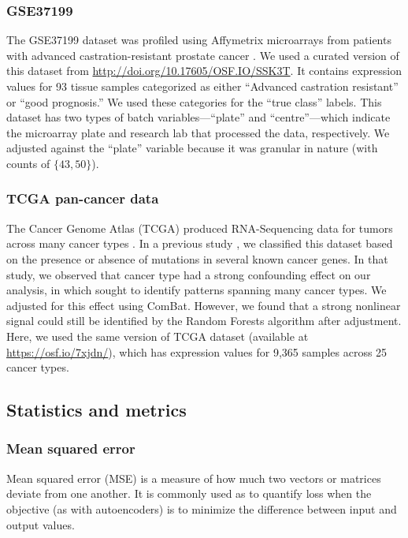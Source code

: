 \documentclass[11pt]{article}
\begin{document}
\subsubsection{GSE37199}

The GSE37199 dataset was profiled using Affymetrix microarrays from patients with advanced castration-resistant prostate cancer \cite{olmos_prognostic_2012}.
We used a curated version of this dataset from \url{http://doi.org/10.17605/OSF.IO/SSK3T}\cite{golightly_curated_2018}.
It contains expression values for 93 tissue samples categorized as either ``Advanced castration resistant'' or ``good prognosis.''
We used these categories for the ``true class'' labels.
This dataset has two types of batch variables---``plate'' and ``centre''---which indicate the microarray plate and research lab that processed the data, respectively.
We adjusted against the ``plate'' variable because it was granular in nature (with counts of $\{43, 50\}$).

\subsubsection{TCGA pan-cancer data}

The Cancer Genome Atlas (TCGA) produced RNA-Sequencing data for tumors across many cancer types \cite{the_cancer_genome_atlas_research_network_cancer_2013}.
In a previous study \cite{dayton_classifying_2017-1}, we classified this dataset based on the presence or absence of mutations in several known cancer genes.
In that study, we observed that cancer type had a strong confounding effect on our analysis, in which sought to identify patterns spanning many cancer types. We adjusted for this effect using ComBat.
However, we found that a strong nonlinear signal could still be identified by the Random Forests algorithm after adjustment.
Here, we used the same version of TCGA dataset (available at \url{https://osf.io/7xjdn/}),
which has expression values for 9,365 samples across 25 cancer types.

\subsection{Statistics and metrics}

\subsubsection{Mean squared error}

Mean squared error (MSE) is a measure of how much two vectors or matrices deviate from one another.
It is commonly used as to quantify loss when the objective (as with autoencoders) is to minimize the difference between input and output values.
\end{document}
